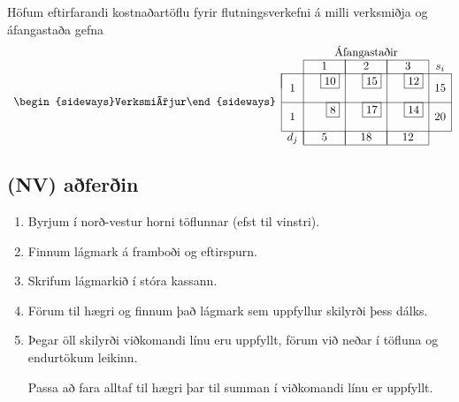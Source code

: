 \begin{daemi}\label{daemi:flutningur}Höfum eftirfarandi kostnaðartöflu fyrir flutningsverkefni á milli verksmiðja og áfangastaða gefna 
\[ \begin{array}{cccr|cr|crcc}
 & & \multicolumn{6}{c}{\mbox{Áfangastaðir}} \\ \cline{3-8}
 & & \multicolumn{2}{|c|}{1} & \multicolumn{2}{|c|}{2} & \multicolumn{2}{|c|}{3} & s_i \\ \cline{2-9}
\multicolumn{1}{c|}{\multirow{4}{*}{\begin{sideways}Verksmiðjur\end{sideways}}} 
& \multicolumn{1}{|c|}{\multirow{2}{*}{1}} &   & \scriptscriptstyle{\fbox{10}}&    & \scriptscriptstyle{\fbox{15}} & & \scriptscriptstyle{\fbox{12}} & \multicolumn{1}{|c|}{\multirow{2}{*}{15}} \\ 
& \multicolumn{1}{|c|}{                  } &  &    &  &    & &    & \multicolumn{1}{|c|}{}\\ \cline{2-9}
& \multicolumn{1}{|c|}{\multirow{2}{*}{1}} &   & \scriptscriptstyle{\fbox{8}}&    & \scriptscriptstyle{\fbox{17}} &  & \scriptscriptstyle{\fbox{14}} & \multicolumn{1}{|c|}{\multirow{2}{*}{20}} \\ 
& \multicolumn{1}{|c|}{                  } &   &    &  &    & &    & \multicolumn{1}{|c|}{}\\ \cline{2-9}
&  \multicolumn{1}{c|}{d_j}& \multicolumn{2}{|c|}{5} & \multicolumn{2}{|c|}{18} & \multicolumn{2}{|c|}{12} & \\ \cline{3-8}
\end{array}
\]
\end{daemi}
\subsection{ (NV) aðferðin}
\begin{enumerate}
\item Byrjum í norð-vestur horni töflunnar (efst til vinstri). 
\item Finnum lágmark á framboði og eftirspurn. %
\item Skrifum lágmarkið í stóra kassann.%
\item Förum til hægri og finnum það lágmark sem uppfyllur skilyrði þess dálks. %
\item Þegar öll skilyrði viðkomandi línu eru uppfyllt, förum við neðar í töfluna og endurtökum leikinn.
\begin{aths}Passa að fara alltaf til hægri þar til summan í viðkomandi línu er uppfyllt.\end{aths}
\end{enumerate}


